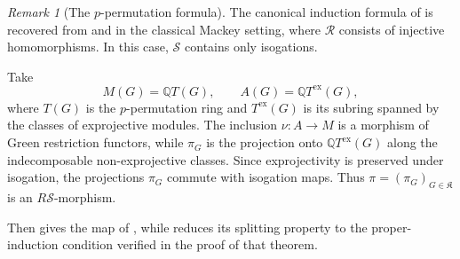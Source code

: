 \documentclass{amsart}
\numberwithin{equation}{section}%
\theoremstyle{remark}
\newtheorem{Rem}[equation]{Remark}
\theoremstyle{definition}
\newcommand{\s}{\mathcal S}
\begin{document}
\begin{Rem}[The $p$-permutation formula]
\label{rem:p-permutation-canonical-induction}
The canonical induction formula of
\cite{BarkerMutlu19} is recovered from
 and
in the classical Mackey setting, where
$\mathcal R$ consists of injective homomorphisms.
In this case, $\mathcal S$ contains only isogations.

Take
\[
M(G)=\mathbb Q T(G),
\qquad
A(G)=\mathbb Q T^{\mathrm{ex}}(G),
\]
where $T(G)$ is the $p$-permutation ring and
$T^{\mathrm{ex}}(G)$ is its subring spanned by the
classes of exprojective modules.
The inclusion
$\nu\colon A\longrightarrow M$
is a morphism of Green restriction functors, while
$\pi_G$ is the projection onto
$\mathbb Q T^{\mathrm{ex}}(G)$ along the
indecomposable non-exprojective classes.
Since exprojectivity is preserved under isogation,
the projections $\pi_G$ commute with isogation maps.
Thus $\pi=(\pi_G)_{G\in\mathfrak K}$ is an
$R\s$-morphism.

Then  gives
the map of \cite[Theorem~3.1]{BarkerMutlu19},
while 
reduces its splitting property to the
proper-induction condition verified in the proof
of that theorem.
\end{Rem}







%
%
\end{document}
